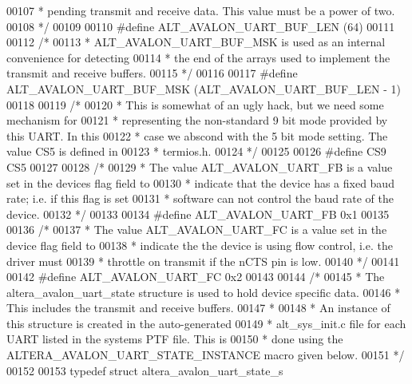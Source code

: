 \begin{DoxyCode}
00107 \textcolor{comment}{ * pending transmit and receive data. This value must be a power of two.}
00108 \textcolor{comment}{ */}
00109 
00110 \textcolor{preprocessor}{#define ALT\_AVALON\_UART\_BUF\_LEN (64)}
00111 
00112 \textcolor{comment}{/*}
00113 \textcolor{comment}{ * ALT\_AVALON\_UART\_BUF\_MSK is used as an internal convenience for detecting }
00114 \textcolor{comment}{ * the end of the arrays used to implement the transmit and receive buffers.}
00115 \textcolor{comment}{ */}
00116 
00117 \textcolor{preprocessor}{#define ALT\_AVALON\_UART\_BUF\_MSK (ALT\_AVALON\_UART\_BUF\_LEN - 1)}
00118 
00119 \textcolor{comment}{/*}
00120 \textcolor{comment}{ * This is somewhat of an ugly hack, but we need some mechanism for}
00121 \textcolor{comment}{ * representing the non-standard 9 bit mode provided by this UART. In this}
00122 \textcolor{comment}{ * case we abscond with the 5 bit mode setting. The value CS5 is defined in}
00123 \textcolor{comment}{ * termios.h.}
00124 \textcolor{comment}{ */}
00125 
00126 \textcolor{preprocessor}{#define CS9 CS5}
00127 
00128 \textcolor{comment}{/*}
00129 \textcolor{comment}{ * The value ALT\_AVALON\_UART\_FB is a value set in the devices flag field to}
00130 \textcolor{comment}{ * indicate that the device has a fixed baud rate; i.e. if this flag is set}
00131 \textcolor{comment}{ * software can not control the baud rate of the device.}
00132 \textcolor{comment}{ */}
00133 
00134 \textcolor{preprocessor}{#define ALT\_AVALON\_UART\_FB 0x1}
00135 
00136 \textcolor{comment}{/*}
00137 \textcolor{comment}{ * The value ALT\_AVALON\_UART\_FC is a value set in the device flag field to}
00138 \textcolor{comment}{ * indicate the the device is using flow control, i.e. the driver must }
00139 \textcolor{comment}{ * throttle on transmit if the nCTS pin is low.}
00140 \textcolor{comment}{ */}
00141 
00142 \textcolor{preprocessor}{#define ALT\_AVALON\_UART\_FC 0x2}
00143 
00144 \textcolor{comment}{/*}
00145 \textcolor{comment}{ * The altera\_avalon\_uart\_state structure is used to hold device specific data.}
00146 \textcolor{comment}{ * This includes the transmit and receive buffers.}
00147 \textcolor{comment}{ *}
00148 \textcolor{comment}{ * An instance of this structure is created in the auto-generated }
00149 \textcolor{comment}{ * alt\_sys\_init.c file for each UART listed in the systems PTF file. This is}
00150 \textcolor{comment}{ * done using the ALTERA\_AVALON\_UART\_STATE\_INSTANCE macro given below.}
00151 \textcolor{comment}{ */}
00152 
00153 \textcolor{keyword}{typedef} \textcolor{keyword}{struct }altera_avalon_uart_state_s

\end{DoxyCode}
